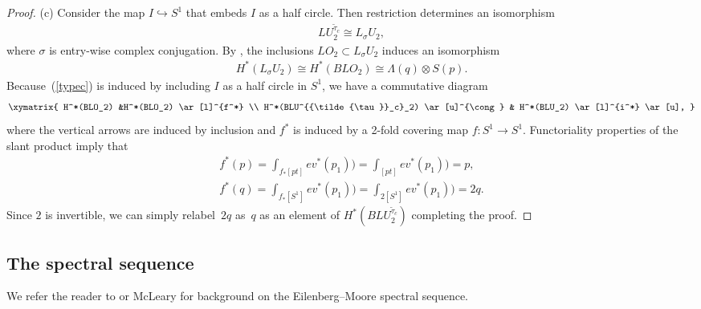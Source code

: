 \documentclass[10pt,a4paper]{amsart}
\numberwithin{equation}{section}
\begin{document}
\begin{proof}
(c) Consider the map $I \hookrightarrow S^1$ that embeds $I$ as a half circle. Then restriction determines an isomorphism
\begin{gather}\label{typec}
LU_2^{{\tilde{\tau}}_c} \cong L_{\sigma}U_2,
\end{gather}
where $\sigma$ is entry-wise complex conjugation. By \cite[Corollary~7.5]{B2}, the inclusions $LO_2 \subset L_{\sigma} U_2$ induces an isomorphism \begin{gather*} H^*( L_{\sigma} U_2) \cong H^*(BLO_2) \cong \Lambda (q) \otimes S(p).\end{gather*}
Because~(\ref{typec}) is induced by including $I$ as a half circle in $S^1$, we have a commutative diagram
\begin{gather*}\xymatrix{ H^*(BLO_2) &H^*(BLO_2) \ar[l]^{f^*} \\
H^*(BLU^{{\tilde{\tau}}_c}_2) \ar[u]^{\cong} & H^*(BLU_2) \ar[l]^{i^*} \ar[u], }\end{gather*}
where the vertical arrows are induced by inclusion and $f^*$ is induced by a 2-fold covering map $f\colon S^1 \rightarrow S^1$.
Functoriality properties of the slant product imply that
\begin{gather*} f^*(p) = \int_{f_*[pt]} ev^*(p_1)) = \int_{[pt]} ev^*(p_1)) = p , \\
 f^*(q) = \int_{f_*[S^1]} ev^*(p_1)) = \int_{2[S^1]} ev^*(p_1)) = 2 q .\end{gather*}
Since $2$ is invertible, we can simply relabel~$2q$ as~$q$ as an element of $H^*(BLU_2^{{\tilde{\tau}}_c})$ completing the proof.
\end{proof}

\subsection{The spectral sequence}

We refer the reader to \cite[Appendix~A]{B} or McLeary \cite[Section~7.1]{M} for background on the Eilenberg--Moore spectral sequence.
\end{document}
